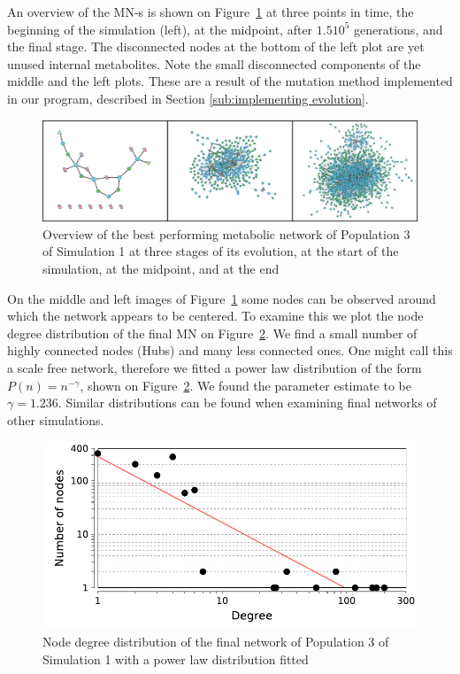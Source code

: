 \documentclass[a4paper,12pt]{article}
\begin{document}
An overview of the MN-s is shown on Figure~\ref{fig:init-mid-final} at three points in time, the beginning of the simulation (left), at the midpoint, after $1.5 10^5$ generations, and the final stage. The disconnected nodes at the bottom of the left plot are yet unused internal metabolites. Note the small disconnected components of the middle and the left plots. These are a result of the mutation method implemented in our program, described in Section \ref{sub:implementing evolution}. 

\begin{figure}[htpb]
	\centering
	\includegraphics[width=1\linewidth]{init-mid-final.png}
	\caption{Overview of the best performing metabolic network of Population 3 of Simulation 1 at three stages of its evolution, at the start of the simulation, at the midpoint, and at the end}
	\label{fig:init-mid-final}
\end{figure}

On the middle and left images of Figure~\ref{fig:init-mid-final} some nodes can be observed around which the network appears to be centered. To examine this we plot the node degree distribution of the final MN on Figure~\ref{fig:nodedegreedistro}. We find a small number of highly connected nodes (Hubs) and many less connected ones. One might call this a scale free network, therefore we fitted a power law distribution of the form $P(n)=n^{-\gamma}$, shown on Figure~\ref{fig:nodedegreedistro}. We found the parameter estimate to be $\gamma=1.236$. Similar distributions can be found when examining final networks of other simulations. 





\begin{figure}[htpb]
	\centering
	\includegraphics[width=0.8\linewidth]{nodedegreedistro.pdf}
	\caption{Node degree distribution of the final network of Population 3 of Simulation 1 with a power law distribution fitted}
	\label{fig:nodedegreedistro}
\end{figure}
\end{document}
